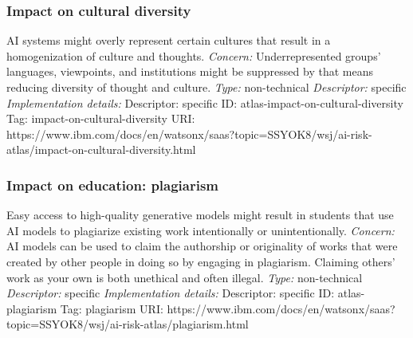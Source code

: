 \documentclass{article}
\begin{document}
\subsubsection*{Impact on cultural diversity}
AI systems might overly represent certain cultures that result in a homogenization of culture and thoughts.\newline
\textit{Concern: }Underrepresented groups' languages, viewpoints, and institutions might be suppressed by that means reducing diversity of thought and culture.\newline\newline
\textit{Type: }non-technical\newline
\textit{Descriptor: }specific \newline\newline
\textit{Implementation details:} \newline
Descriptor: specific \newline
ID: atlas-impact-on-cultural-diversity \newline
Tag: impact-on-cultural-diversity \newline
URI:  https://www.ibm.com/docs/en/watsonx/saas?topic=SSYOK8/wsj/ai-risk-atlas/impact-on-cultural-diversity.html\newline
\subsubsection*{Impact on education: plagiarism}
Easy access to high-quality generative models might result in students that use AI models to plagiarize existing work intentionally or unintentionally.\newline
\textit{Concern: }AI models can be used to claim the authorship or originality of works that were created by other people in doing so by engaging in plagiarism. Claiming others' work as your own is both unethical and often illegal.\newline\newline
\textit{Type: }non-technical\newline
\textit{Descriptor: }specific \newline\newline
\textit{Implementation details:} \newline
Descriptor: specific \newline
ID: atlas-plagiarism \newline
Tag: plagiarism \newline
URI:  https://www.ibm.com/docs/en/watsonx/saas?topic=SSYOK8/wsj/ai-risk-atlas/plagiarism.html\newline
\end{document}
